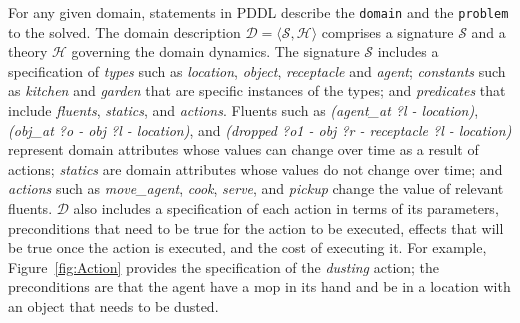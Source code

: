 For any given domain, statements in PDDL describe the \texttt{domain} and the \texttt{problem} to the solved. The domain description $\mathcal{D} = \langle \mathcal{S}, \mathcal{H}\rangle$ comprises a signature $\mathcal{S}$ and a theory $\mathcal{H}$ governing the domain dynamics. The signature $\mathcal{S}$ includes a specification of \textit{types} such as \textit{location}, \textit{object}, \textit{receptacle} and \textit{agent}; \textit{constants} such as \textit{kitchen} and \textit{garden} that are specific instances of the types; and \textit{predicates} that include \textit{fluents}, \textit{statics}, and \textit{actions}. Fluents such as \textit{(agent\_at ?l - location)}, \textit{(obj\_at ?o - obj ?l - location)}, and \textit{(dropped ?o1 - obj ?r - receptacle ?l - location)} represent domain attributes whose values can change over time as a result of actions; \textit{statics} are domain attributes whose values do not change over time; and \textit{actions} such as \textit{move\_agent}, \textit{cook}, \textit{serve}, and \textit{pickup} change the value of relevant fluents. $\mathcal{D}$ also includes a specification of each action in terms of its parameters, preconditions that need to be true for the action to be executed, effects that will be true once the action is executed, and the cost of executing it. For example, Figure~\ref{fig:Action} provides the specification of the \textit{dusting} action; the preconditions are that the agent have a mop in its hand and be in a location with an object that needs to be dusted.




